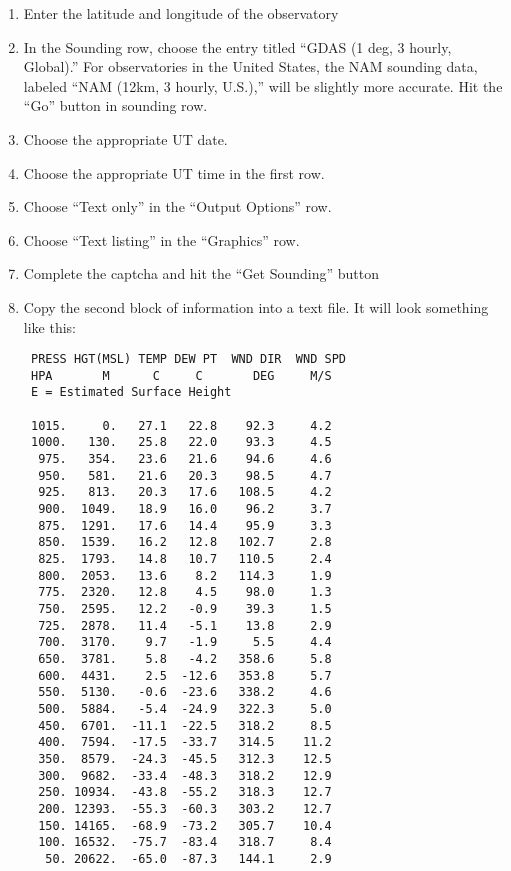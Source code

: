 \documentclass{article}
\begin{document}
\begin{enumerate}
  \item Enter the latitude and longitude of the observatory
  \item In the Sounding row, choose the entry titled ``GDAS (1 deg, 3 hourly, Global).'' For observatories in the United States, the NAM sounding data, labeled ``NAM (12km, 3 hourly, U.S.),'' will be slightly more accurate. Hit the ``Go'' button in sounding row.
  \item Choose the appropriate UT date.
  \item Choose the appropriate UT time in the first row.
  \item Choose ``Text only'' in the ``Output Options'' row.
  \item Choose ``Text listing'' in the ``Graphics'' row.
  \item Complete the captcha and hit the ``Get Sounding'' button
  \item Copy the second block of information into a text file. It will look something like this:
  \begin{verbatim}
 PRESS HGT(MSL) TEMP DEW PT  WND DIR  WND SPD
 HPA       M      C     C       DEG     M/S  
 E = Estimated Surface Height

 1015.     0.   27.1   22.8    92.3     4.2
 1000.   130.   25.8   22.0    93.3     4.5
  975.   354.   23.6   21.6    94.6     4.6
  950.   581.   21.6   20.3    98.5     4.7
  925.   813.   20.3   17.6   108.5     4.2
  900.  1049.   18.9   16.0    96.2     3.7
  875.  1291.   17.6   14.4    95.9     3.3
  850.  1539.   16.2   12.8   102.7     2.8
  825.  1793.   14.8   10.7   110.5     2.4
  800.  2053.   13.6    8.2   114.3     1.9
  775.  2320.   12.8    4.5    98.0     1.3
  750.  2595.   12.2   -0.9    39.3     1.5
  725.  2878.   11.4   -5.1    13.8     2.9
  700.  3170.    9.7   -1.9     5.5     4.4
  650.  3781.    5.8   -4.2   358.6     5.8
  600.  4431.    2.5  -12.6   353.8     5.7
  550.  5130.   -0.6  -23.6   338.2     4.6
  500.  5884.   -5.4  -24.9   322.3     5.0
  450.  6701.  -11.1  -22.5   318.2     8.5
  400.  7594.  -17.5  -33.7   314.5    11.2
  350.  8579.  -24.3  -45.5   312.3    12.5
  300.  9682.  -33.4  -48.3   318.2    12.9
  250. 10934.  -43.8  -55.2   318.3    12.7
  200. 12393.  -55.3  -60.3   303.2    12.7
  150. 14165.  -68.9  -73.2   305.7    10.4
  100. 16532.  -75.7  -83.4   318.7     8.4
   50. 20622.  -65.0  -87.3   144.1     2.9
  \end{verbatim}
\end{enumerate}
\end{document}
